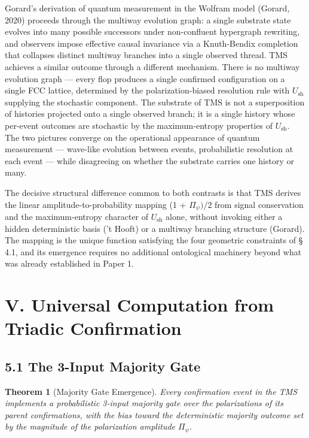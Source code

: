 \documentclass[11pt,oneside]{report}
\newtheorem{theorem}{Theorem}[section]
\theoremstyle{definition}
\theoremstyle{remark}
\begin{document}
Gorard's derivation of quantum measurement in the Wolfram model (Gorard,
2020) proceeds through the multiway evolution graph: a single substrate
state evolves into many possible successors under non-confluent
hypergraph rewriting, and observers impose effective causal invariance
via a Knuth-Bendix completion that collapses distinct multiway branches
into a single observed thread. TMS achieves a similar outcome through a
different mechanism. There is no multiway evolution graph --- every flop
produces a single confirmed configuration on a single FCC lattice,
determined by the polarization-biased resolution rule with \ensuremath{U_{\mathrm{sh}}} supplying
the stochastic component. The substrate of TMS is not a superposition of
histories projected onto a single observed branch; it is a single
history whose per-event outcomes are stochastic by the maximum-entropy
properties of \ensuremath{U_{\mathrm{sh}}.} The two pictures converge on the operational
appearance of quantum measurement --- wave-like evolution between
events, probabilistic resolution at each event --- while disagreeing on
whether the substrate carries one history or many.

The decisive structural difference common to both contrasts is that TMS
derives the linear amplitude-to-probability mapping (1 + \ensuremath{\Pi_{\psi})/2} from
signal conservation and the maximum-entropy character of \ensuremath{U_{\mathrm{sh}}} alone,
without invoking either a hidden deterministic basis ('t Hooft) or a
multiway branching structure (Gorard). The mapping is the unique
function satisfying the four geometric constraints of \S\,4.1, and its
emergence requires no additional ontological machinery beyond what was
already established in Paper 1.

\section*{V. Universal Computation from Triadic Confirmation}

\subsection*{5.1 The 3-Input Majority Gate}

\begin{theorem}[Majority Gate Emergence]
Every confirmation event in the TMS
implements a probabilistic 3-input majority gate over the polarizations
of its parent confirmations, with the bias toward the deterministic
majority outcome set by the magnitude of the polarization amplitude
\textbar \ensuremath{\Pi_{\psi}}\textbar.
\end{theorem}
\end{document}
